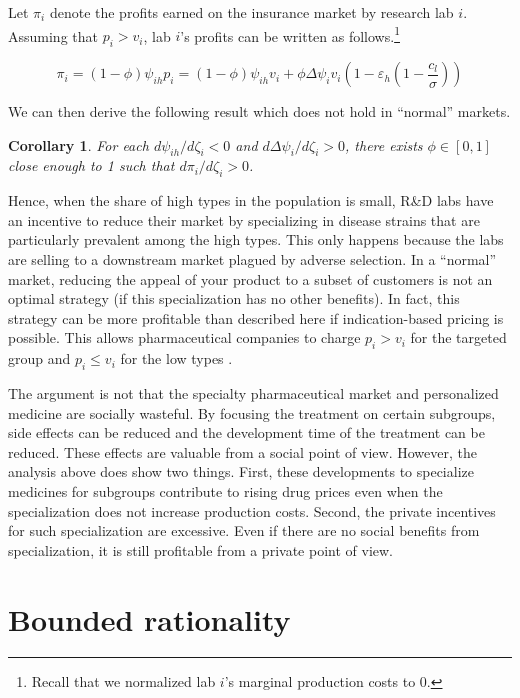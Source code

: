 \documentclass[a4paper,12pt]{article}
\newtheorem{corollary}{Corollary}
\begin{document}
Let \(\pi_i\) denote the profits earned on the insurance market by research lab \(i\). Assuming that \(p_i>v_i\), lab \(i\)'s profits can be written as follows.\footnote{Recall that we normalized lab \(i\)'s marginal production costs to 0.}

\begin{equation}
\label{eq:38}
\pi_i = (1-\phi)\psi_{ih}p_i=(1-\phi)\psi_{ih}v_i+\phi\Delta\psi_iv_i (1-\varepsilon_h(1-\frac{c_l}{\sigma}))
\end{equation}

We can then derive the following result which does not hold in ``normal'' markets.

\begin{corollary}
\label{Targeting_profitable}
For each \(d\psi_{ih}/d\zeta_i<0\) and \(d\Delta\psi_i/d\zeta_i>0\), there exists \(\phi \in [0,1]\) close enough to 1 such that \(d\pi_i/d\zeta_i>0\).
\end{corollary}

Hence, when the share of high types in the population is small, R\&D labs have an incentive to reduce their market by specializing in disease strains that are particularly prevalent among the high types. This only happens because the labs are selling to a downstream market plagued by adverse selection. In a ``normal'' market, reducing the appeal of your product to a subset of customers is not an optimal strategy (if this specialization has no other benefits). In fact, this strategy can be more profitable than described here if indication-based pricing is possible. This allows pharmaceutical companies to charge \(p_i > v_i\) for the targeted group and \(p_i \leq v_i\) for the low types \citep{NBERc13994}.

The argument is not that the specialty pharmaceutical market and personalized medicine are socially wasteful. By focusing the treatment on certain subgroups, side effects can be reduced and the development time of the treatment can be reduced. These effects are valuable from a social point of view. However, the analysis above does show two things. First, these developments to specialize medicines for subgroups contribute to rising drug prices even when the specialization does not increase production costs. Second, the private incentives for such specialization are excessive. Even if there are no social benefits from specialization, it is still profitable from a private point of view.


\section{Bounded rationality}
\label{sec:orgc5cc31d}
\end{document}
